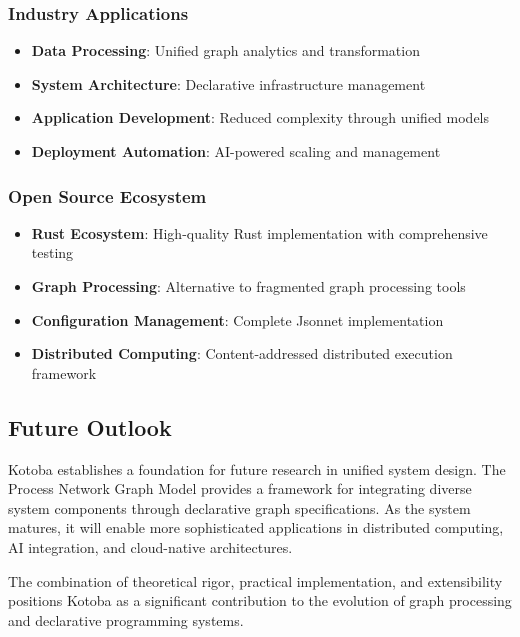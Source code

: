 \documentclass[11pt,a4paper]{article}
\begin{document}
\subsubsection{Industry Applications}
\label{subsubsec:industry_impact}

\begin{itemize}
\item \textbf{Data Processing}: Unified graph analytics and transformation
\item \textbf{System Architecture}: Declarative infrastructure management
\item \textbf{Application Development}: Reduced complexity through unified models
\item \textbf{Deployment Automation}: AI-powered scaling and management
\end{itemize}

\subsubsection{Open Source Ecosystem}
\label{subsubsec:open_source}

\begin{itemize}
\item \textbf{Rust Ecosystem}: High-quality Rust implementation with comprehensive testing
\item \textbf{Graph Processing}: Alternative to fragmented graph processing tools
\item \textbf{Configuration Management}: Complete Jsonnet implementation
\item \textbf{Distributed Computing}: Content-addressed distributed execution framework
\end{itemize}

\subsection{Future Outlook}
\label{subsec:outlook}

Kotoba establishes a foundation for future research in unified system design. The Process Network Graph Model provides a framework for integrating diverse system components through declarative graph specifications. As the system matures, it will enable more sophisticated applications in distributed computing, AI integration, and cloud-native architectures.

The combination of theoretical rigor, practical implementation, and extensibility positions Kotoba as a significant contribution to the evolution of graph processing and declarative programming systems.



\end{document}

